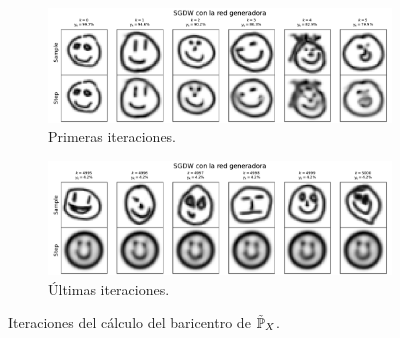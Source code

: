 \begin{figure}[H]
    \centering
    \begin{subfigure}[b]{0.75\textwidth}
        \includegraphics[width=\textwidth]{img/sgdw-iters/first-iters-GAN.pdf}
        \caption{Primeras iteraciones.}
        \label{fig:first-iters-GAN}
    \end{subfigure}
    \begin{subfigure}[b]{0.75\textwidth}
        \includegraphics[width=\textwidth]{img/sgdw-iters/last-iters-GAN.pdf}
        \caption{Últimas iteraciones.}
        \label{fig:last-iters-GAN}
    \end{subfigure}
    \caption{Iteraciones del cálculo del baricentro de $\tilde\Prob_X$.}
    \label{fig:iters-GAN}
\end{figure}

